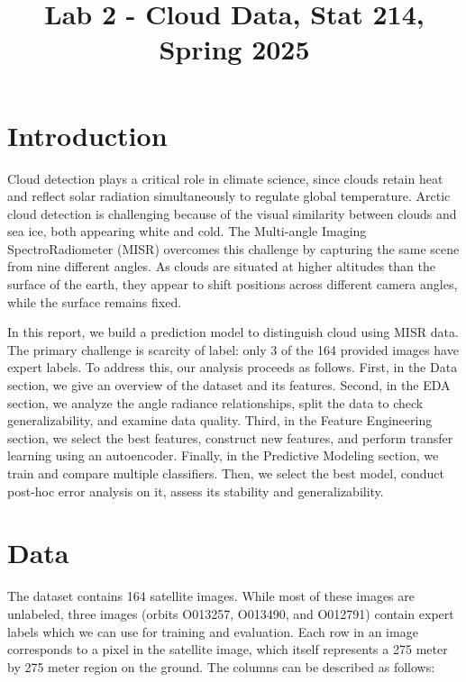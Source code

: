 \documentclass[10pt,letterpaper]{article}
\title{Lab 2 - Cloud Data, Stat 214, Spring 2025\vspace{-2em}}
\begin{document}
\maketitle

\section{Introduction}

Cloud detection plays a critical role in climate science, since clouds retain heat and reflect solar radiation simultaneously to regulate global temperature. Arctic cloud detection is challenging because of the visual similarity between clouds and sea ice, both appearing white and cold. The Multi-angle Imaging SpectroRadiometer (MISR) overcomes this challenge by capturing the same scene from nine different angles. As clouds are situated at higher altitudes than the surface of the earth, they appear to shift positions across different camera angles, while the surface remains fixed. 

In this report, we build a prediction model to distinguish cloud using MISR data. The primary challenge is scarcity of label: only 3 of the 164 provided images have expert labels. To address this, our analysis proceeds as follows. First, in the Data section, we  give an overview of the dataset and its features. Second, in the EDA section, we analyze the angle radiance relationships, split the data to check generalizability, and examine data quality. Third, in the Feature Engineering section, we select the best features, construct new features, and perform transfer learning using an autoencoder. Finally, in the Predictive Modeling section, we train and compare multiple classifiers. Then, we select the best model, conduct post-hoc error analysis on it, assess its stability and generalizability.

\section{Data}

The dataset contains 164 satellite images. While most of these images are unlabeled, three images (orbits O013257, O013490, and O012791) contain expert labels which we can use for training and evaluation. Each row in an image corresponds to a pixel in the satellite image, which itself represents a 275 meter by 275 meter region on the ground. The columns can be described as follows:
\end{document}
